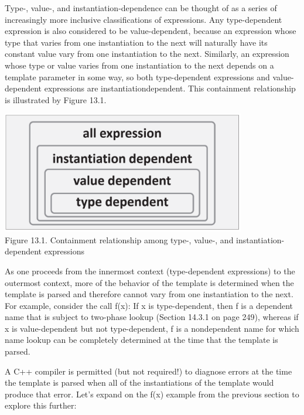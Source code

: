 Type-, value-, and instantiation-dependence can be thought of as a series of increasingly more inclusive classifications of expressions. Any type-dependent expression is also considered to be value-dependent, because an expression whose type that varies from one instantiation to the next will naturally have its constant value vary from one instantiation to the next. Similarly, an expression whose type or value varies from one instantiation to the next depends on a template parameter in some way, so both type-dependent expressions and value-dependent expressions are instantiationdependent. This containment relationship is illustrated by Figure 13.1.

\begin{center}
\includegraphics[width=0.8\textwidth]{content/2/chapter13/images/13.1.png} \\
Figure 13.1. Containment relationship among type-, value-, and instantiation-dependent expressions
\end{center}

As one proceeds from the innermost context (type-dependent expressions) to the outermost context, more of the behavior of the template is determined when the template is parsed and therefore cannot vary from one instantiation to the next. For example, consider the call f(x): If x is type-dependent, then f is a dependent name that is subject to two-phase lookup (Section 14.3.1 on page 249), whereas if x is value-dependent but not type-dependent, f is a nondependent name for which name lookup can be completely determined at the time that the template is parsed.


A C++ compiler is permitted (but not required!) to diagnose errors at the time the template is parsed when all of the instantiations of the template would produce that error. Let’s expand on the f(x) example from the previous section to explore this further:

